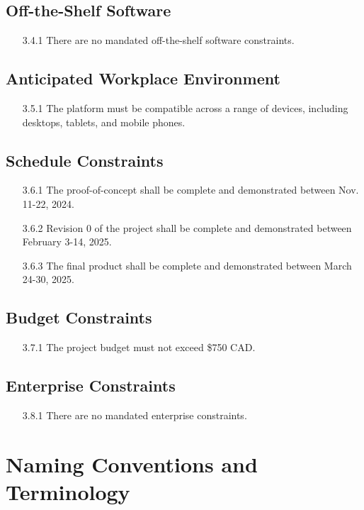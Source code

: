 \documentclass[12pt]{article}
\begin{document}
\subsection{Off-the-Shelf Software}
\begin{itemize}
  \item[3.4.1] \color{red} There are no mandated off-the-shelf software constraints. \color{black}
\end{itemize}
\subsection{Anticipated Workplace Environment}
\begin{itemize}
  \item[3.5.1] The platform must be compatible across a range of devices, including desktops, tablets, and mobile phones.
\end{itemize}
\subsection{Schedule Constraints}
\begin{itemize}
  \item[3.6.1] The proof-of-concept shall be complete and demonstrated between Nov. 11-22, 2024.
  \item[3.6.2] Revision 0 of the project shall be complete and demonstrated between February 3-14, 2025.
  \item[3.6.3] The final product shall be complete and demonstrated between March 24-30, 2025.
\end{itemize}
\subsection{Budget Constraints}
\begin{itemize}
  \item[3.7.1] The project budget must not exceed \$750 CAD. 
\end{itemize}
\subsection{Enterprise Constraints}
\begin{itemize}
  \item[3.8.1] \color{red} There are no mandated enterprise constraints. \color{black}
\end{itemize}

\section{Naming Conventions and Terminology}
\end{document}
